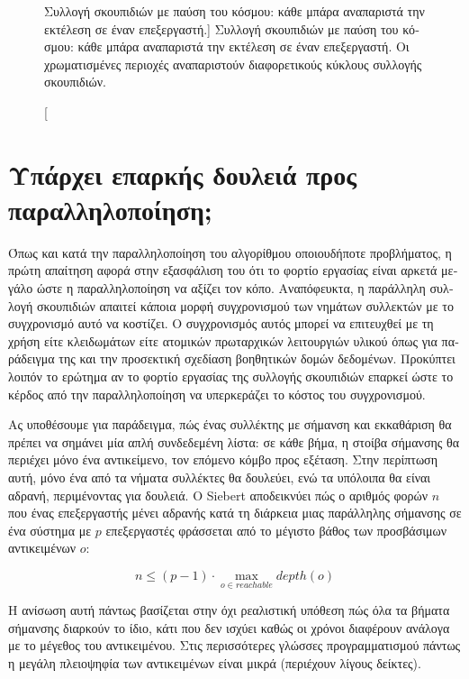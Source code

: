 \begin{greek}
\begin{figure}[H]
  \caption
    [Συλλογή σκουπιδιών με παύση του κόσμου: κάθε μπάρα αναπαριστά
     την εκτέλεση σε έναν επεξεργαστή.]
    {Συλλογή σκουπιδιών με παύση του κόσμου: κάθε μπάρα αναπαριστά
     την εκτέλεση σε έναν επεξεργαστή. Οι χρωματισμένες περιοχές
     αναπαριστούν διαφορετικούς κύκλους συλλογής σκουπιδιών.}
  \label{fig:par_1}
\end{figure}

\section{Υπάρχει επαρκής δουλειά προς παραλληλοποίηση;}
Όπως και κατά την παραλληλοποίηση του αλγορίθμου οποιουδήποτε
προβλήματος, η πρώτη απαίτηση αφορά στην εξασφάλιση του ότι
το φορτίο εργασίας είναι αρκετά μεγάλο ώστε η παραλληλοποίηση
να αξίζει τον κόπο. Αναπόφευκτα, η παράλληλη συλλογή σκουπιδιών
απαιτεί κάποια μορφή συγχρονισμού των νημάτων συλλεκτών με το
συγχρονισμό αυτό να κοστίζει. Ο συγχρονισμός αυτός μπορεί να
επιτευχθεί με τη χρήση είτε κλειδωμάτων είτε ατομικών πρωταρχικών
λειτουργιών υλικού όπως για παράδειγμα της 
και την προσεκτική σχεδίαση βοηθητικών δομών δεδομένων. Προκύπτει
λοιπόν το ερώτημα αν το φορτίο εργασίας της συλλογής σκουπιδιών
επαρκεί ώστε το κέρδος από την παραλληλοποίηση να υπερκεράζει το
κόστος του συγχρονισμού.

Ας υποθέσουμε για παράδειγμα, πώς ένας συλλέκτης με σήμανση
και εκκαθάριση θα πρέπει να σημάνει μία απλή συνδεδεμένη λίστα:
σε κάθε βήμα, η στοίβα σήμανσης θα περιέχει μόνο ένα αντικείμενο,
τον επόμενο κόμβο προς εξέταση. Στην περίπτωση αυτή, μόνο ένα από
τα νήματα συλλέκτες θα δουλεύει, ενώ τα υπόλοιπα θα είναι αδρανή,
περιμένοντας για δουλειά. Ο Siebert \cite{DBLP:conf/iwmm/Siebert08}
αποδεικνύει πώς ο αριθμός φορών $n$ που ένας επεξεργαστής μένει
αδρανής κατά τη διάρκεια μιας παράλληλης σήμανσης σε ένα σύστημα
με $p$ επεξεργαστές φράσσεται από το μέγιστο βάθος των προσβάσιμων
αντικειμένων $o$:

\begin{equation}
  n \leq (p-1) \cdot \max_{o \in reachable}{depth(o)}
  \label{eq:par_1}
\end{equation}

Η ανίσωση αυτή πάντως βασίζεται στην όχι ρεαλιστική υπόθεση
πώς όλα τα βήματα σήμανσης διαρκούν το ίδιο, κάτι που δεν ισχύει
καθώς οι χρόνοι διαφέρουν ανάλογα με το μέγεθος του αντικειμένου.
Στις περισσότερες γλώσσες προγραμματισμού πάντως η μεγάλη πλειοψηφία
των αντικειμένων είναι μικρά (περιέχουν λίγους δείκτες).


\end{greek}
